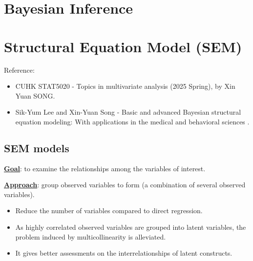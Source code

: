 \documentclass[10pt,a4paper]{book}
\begin{document}
\chapter{Bayesian Inference}\label{chap:bayes_inference}



\chapter{Structural Equation Model (SEM)}\label{chap:SEM}
Reference: 
\begin{itemize}
	\item CUHK STAT5020 - Topics in multivariate analysis (2025 Spring), by Xin Yuan SONG.
	\item Sik-Yum Lee and Xin-Yuan Song - Basic and advanced
	Bayesian structural equation modeling: With applications in the
	medical and behavioral sciences \cite{lee2012basic}.
\end{itemize}

\section{SEM models}\label{sec:SEM_models}

\noindent \textbf{\underline{Goal}}: to examine the relationships among the variables of interest.

\noindent \textbf{\underline{Approach}}: group observed variables to form  (a combination of several observed variables).
\begin{itemize}
	\item Reduce the number of variables compared to direct regression.
	\item As highly correlated observed variables are grouped into latent variables, the problem induced by multicollinearity is alleviated.
	\item It gives better assessments on the interrelationships of latent constructs.
\end{itemize}
\end{document}
